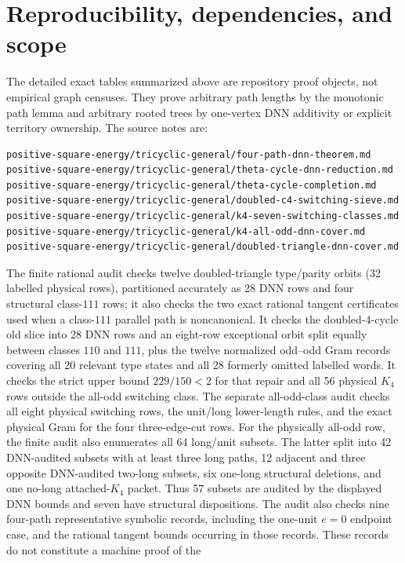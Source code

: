 \documentclass[11pt]{article}
\theoremstyle{remark}
\begin{document}
\section{Reproducibility, dependencies, and scope}

The detailed exact tables summarized above are repository proof objects, not
empirical graph censuses.  They prove arbitrary path lengths by the monotonic
path lemma and arbitrary rooted trees by one-vertex DNN additivity or explicit
territory ownership.  The source notes are:
\begin{verbatim}
positive-square-energy/tricyclic-general/four-path-dnn-theorem.md
positive-square-energy/tricyclic-general/theta-cycle-dnn-reduction.md
positive-square-energy/tricyclic-general/theta-cycle-completion.md
positive-square-energy/tricyclic-general/doubled-c4-switching-sieve.md
positive-square-energy/tricyclic-general/k4-seven-switching-classes.md
positive-square-energy/tricyclic-general/k4-all-odd-dnn-cover.md
positive-square-energy/tricyclic-general/doubled-triangle-dnn-cover.md
\end{verbatim}
The finite rational audit checks twelve doubled-triangle type/parity orbits
(32 labelled physical rows), partitioned accurately as 28 DNN rows and four
structural class-$111$ rows; it also checks the two exact rational tangent
certificates used when a class-$111$ parallel path is noncanonical.  It checks
the doubled-$4$-cycle old slice into 28 DNN rows and an eight-row exceptional
orbit split equally between classes $110$ and $111$, plus the twelve normalized
odd--odd Gram records covering all 20 relevant type states and all 28 formerly
omitted labelled words.  It checks the strict upper bound $229/150<2$ for that
repair and all 56 physical $K_4$ rows outside the all-odd switching
 class.  The separate all-odd-class audit checks all eight physical switching
rows, the unit/long lower-length rules, and the exact physical Gram for the
four three-edge-cut rows.  For the physically all-odd row, the finite audit
also enumerates all 64 long/unit subsets.  The latter split into 42
DNN-audited subsets with at least three long paths, 12 adjacent and three
opposite DNN-audited two-long subsets, six one-long structural deletions, and
one no-long attached-$K_4$ packet.  Thus 57 subsets are audited by the
displayed DNN bounds and seven have structural dispositions.  The audit
also checks nine four-path representative symbolic records, including the
one-unit $e=0$ endpoint case, and the rational tangent bounds occurring in
those records.  These records do not constitute a machine proof of the
\end{document}
